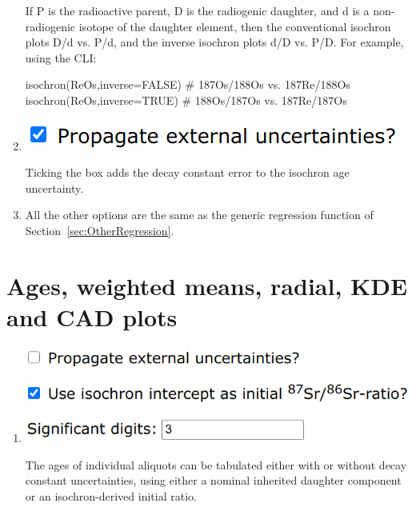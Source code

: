 \begin{refsection}
\begin{enumerate}
If P is the radioactive parent, D is the radiogenic daughter, and d is
a non-radiogenic isotope of the daughter element, then the
conventional isochron plots D/d vs. P/d, and the inverse isochron
plots d/D vs. P/D. For example, using the CLI:
  
\begin{script}
isochron(ReOs,inverse=FALSE) # 187Os/188Os vs. 187Re/188Os
isochron(ReOs,inverse=TRUE)  # 188Os/187Os vs. 187Re/187Os
\end{script}

\item\noindent\begin{minipage}[t]{.4\linewidth}
\strut\vspace*{-\baselineskip}\newline
\includegraphics[width=\linewidth]{../figures/concordiaexterr.png}
\end{minipage}
\begin{minipage}[t]{.6\linewidth}
  Ticking the box adds the decay constant error to the isochron age
  uncertainty.
\end{minipage}

\item All the other options are the same as the generic regression
  function of Section~\ref{sec:OtherRegression}.

\end{enumerate}

\section{Ages, weighted means, radial, KDE and CAD plots}\label{sec:PDages}

\begin{enumerate}

\item\noindent\begin{minipage}[t]{.5\linewidth}
\strut\vspace*{-\baselineskip}\newline
\includegraphics[width=\linewidth]{../figures/PDages.png}
\end{minipage}
\begin{minipage}[t]{.5\linewidth}
  The ages of individual aliquots can be tabulated either with or
  without decay constant uncertainties, using either a nominal
  inherited daughter component or an isochron-derived initial ratio.
\end{minipage}


\end{enumerate}
\end{refsection}
